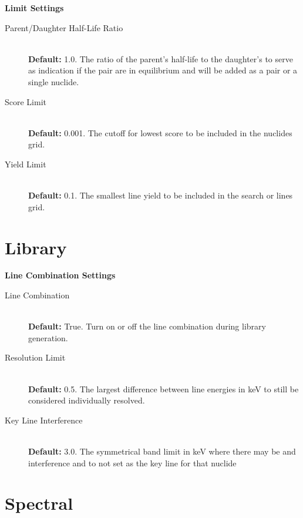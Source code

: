 \documentclass[12pt,report,justified]{SANDreport}
\begin{document}
\begin{center}
{\large \textbf{Limit Settings}}
\end{center}
\begin{description}
\item[Parent/Daughter Half-Life Ratio]\label{itm:pd_hl_ratio} \hfill \\
\textbf{Default:} 1.0. The ratio of the parent’s half-life to the daughter’s to serve as indication if the
pair are in equilibrium and will be added as a pair or a single nuclide.
\item[Score Limit]\label{itm:score_lim} \hfill \\
\textbf{Default:} 0.001. The cutoff for lowest score to be included in the nuclides grid.
\item[Yield Limit]\label{itm:yld_lim} \hfill \\
 \textbf{Default:} 0.1. The smallest line yield to be included in the search or lines grid.
\end{description}


\section{Library}
\begin{center}
{\large \textbf{Line Combination Settings}}
\end{center}
\begin{description}
\item[Line Combination]\label{itm:ln_combo} \hfill \\
\textbf{Default:} True. Turn on or off the line combination during library generation.
\item[Resolution Limit]\label{itm:res_lim} \hfill \\
\textbf{Default:} 0.5. The largest difference between line energies in keV to still be considered
individually resolved.
\item[Key Line Interference]\label{itm:ky_inf} \hfill \\
 \textbf{Default:} 3.0. The symmetrical band limit in keV where there may be and interference and to
not set as the key line for that nuclide
\end{description}
\section{Spectral}
\end{document}
